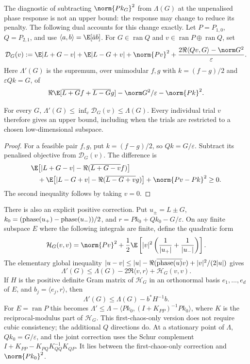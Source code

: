 The diagnostic of subtracting $\norm{Pk_G}^2$ from $\Lambda(G)$ at the
unpenalised phase response is not an upper bound: the response may change
to reduce its penalty. The following dual accounts for this change exactly.
Let $P=P_{1,0}$, $Q=P_{2,1}$, and use
$\langle a,b\rangle=\E[\bar a b]$. For $G\in\operatorname{ran}Q$ and
$v\in\operatorname{ran}P\oplus\operatorname{ran}Q$, set
\[
\mathcal D_G(v):=\E|L+G-v|+\E|L-G+v|+\norm{Pv}^2
+\frac{2\Re\langle Qv,G\rangle-\norm G^2}{\varepsilon}.
\]
Here $\Lambda'(G)$ is the supremum, over unimodular $f,g$ with
$k=(f-g)/2$ and $\varepsilon Qk=G$, of
\[
\Re\E[\overline{L+G}f+\overline{L-G}g]
-\norm G^2/\varepsilon-\norm{Pk}^2.
\]
\begin{proposition}
\label{prop:retained-dual}
For every $G$, $\Lambda'(G)\le\inf_v\mathcal D_G(v)\le\Lambda(G)$.
Every individual trial $v$ therefore gives an upper bound, including when
the trials are restricted to a chosen low-dimensional subspace.
\end{proposition}
\begin{proof}
For a feasible pair $f,g$, put $k=(f-g)/2$, so $Qk=G/\varepsilon$.
Subtract its penalised objective from $\mathcal D_G(v)$. The difference is
\[
\begin{split}
&\E\bigl[|L+G-v|-\Re(\overline{L+G-v}f)\bigr]\\
&\quad+\E\bigl[|L-G+v|-\Re(\overline{L-G+v}g)\bigr]
+\norm{Pv-Pk}^2\ge0.
\end{split}
\]
The second inequality follows by taking $v=0$.
\end{proof}

There is also an explicit positive correction. Put
$u_\pm=L\pm G$, $k_0=(\operatorname{phase}(u_+)-\operatorname{phase}(u_-))/2$, and
$r=Pk_0+Qk_0-G/\varepsilon$. On any finite subspace $E$ where the
following integrals are finite, define the quadratic form
\[
\mathcal H_G(v,v)=\norm{Pv}^2+
\frac12\E\left[|v|^2\left(\frac1{|u_+|}+\frac1{|u_-|}\right)\right].
\]
The elementary global inequality
$|u-v|\le |u|-\Re(\overline{\operatorname{phase}(u)}v)+|v|^2/(2|u|)$ gives
\[
\Lambda'(G)\le\Lambda(G)-2\Re\langle v,r\rangle+\mathcal H_G(v,v).
\]
If $H$ is the positive definite Gram matrix of $\mathcal H_G$ in an
orthonormal basis $e_1,\ldots,e_d$ of $E$, and $b_j=\langle e_j,r\rangle$,
then
\[
\boxed{\Lambda'(G)\le\Lambda(G)-b^*H^{-1}b.}
\]
For $E=\operatorname{ran}P$ this becomes
$\Lambda'\le\Lambda-\langle Pk_0,(I+K_{PP})^{-1}Pk_0\rangle$, where
$K$ is the reciprocal-modulus part of $\mathcal H_G$. This first-chaos-only
version does not require cubic consistency; the additional $Q$ directions
do. At a stationary point of $\Lambda$, $Qk_0=G/\varepsilon$, and the
joint correction uses the Schur complement
$I+K_{PP}-K_{PQ}K_{QQ}^{-1}K_{QP}$. It lies between the first-chaos-only
correction and $\norm{Pk_0}^2$.

